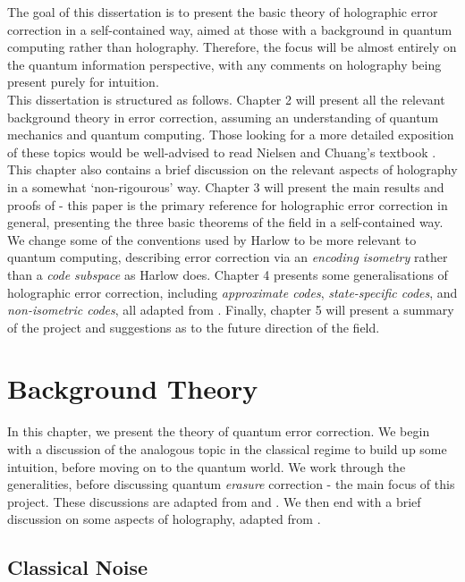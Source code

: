 \documentclass[12pt,a4paper]{report}
\numberwithin{equation}{section}
\theoremstyle{definition}
\theoremstyle{theorem}
\theoremstyle{theorem}
\theoremstyle{example}
\theoremstyle{definition}
\begin{document}
The goal of this dissertation is to present the basic theory of holographic error correction in a self-contained way, aimed at those with a background in quantum computing rather than holography. Therefore, the focus will be almost entirely on the quantum information perspective, with any comments on holography being present purely for intuition.\\
This dissertation is structured as follows. Chapter 2 will present all the relevant background theory in error correction, assuming an understanding of quantum mechanics and quantum computing. Those looking for a more detailed exposition of these topics would be well-advised to read Nielsen and Chuang's textbook \cite{NielsenChuang}. This chapter also contains a brief discussion on the relevant aspects of holography in a somewhat `non-rigourous' way. Chapter 3 will present the main results and proofs of \cite{Harlow} - this paper is the primary reference for holographic error correction in general, presenting the three basic theorems of the field in a self-contained way. We change some of the conventions used by Harlow to be more relevant to quantum computing, describing error correction via an \textit{encoding isometry} rather than a \textit{code subspace} as Harlow does. Chapter 4 presents some generalisations of holographic error correction, including \textit{approximate codes}, \textit{state-specific codes}, and \textit{non-isometric codes}, all adapted from \cite{QMS}. Finally, chapter 5 will present a summary of the project and suggestions as to the future direction of the field.


\chapter{Background Theory}

In this chapter, we present the theory of quantum error correction. We begin with a discussion of the analogous topic in the classical regime to build up some intuition, before moving on to the quantum world. We work through the generalities, before discussing quantum \textit{erasure} correction - the main focus of this project. These discussions are adapted from \cite{NielsenChuang} and \cite{Harlow}. We then end with a brief discussion on some aspects of holography, adapted from \cite{Pollack}.

\section{Classical Noise}
\end{document}
